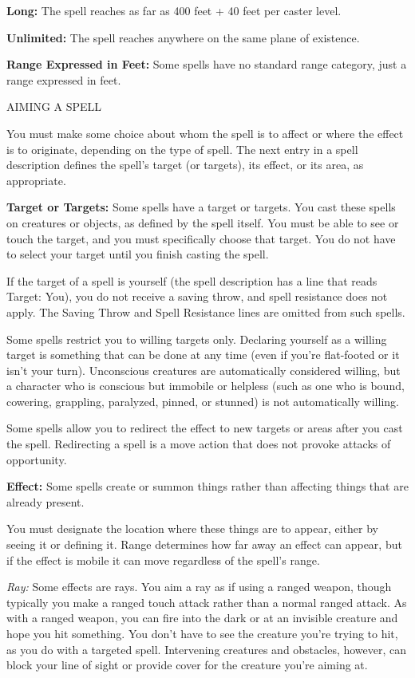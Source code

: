 \documentclass{article}
\begin{document}
\textbf{Long:} The spell reaches as far as 400 feet + 40 feet per caster level.

\textbf{Unlimited:} The spell reaches anywhere on the same plane of existence.

\textbf{Range Expressed in Feet:} Some spells have no standard range category, 
just a range expressed in feet.

\vspace{12pt}
AIMING A SPELL

You must make some choice about whom the spell is to affect or where the effect 
is to originate, depending on the type of spell. The next entry in a spell description 
defines the spell's target (or targets), its effect, or its area, as appropriate.

\textbf{Target or Targets:} Some spells\textit{ }have a target or targets. You 
cast these spells on creatures or objects, as defined by the spell itself. You 
must be able to see or touch the target, and you must specifically choose that 
target. You do not have to select your target until you finish casting the spell.

If the target of a spell is yourself (the spell description has a line that reads 
Target: You), you do not receive a saving throw, and spell resistance does not 
apply. The Saving Throw and Spell Resistance lines are omitted from such spells.

Some spells restrict you to willing targets only. Declaring yourself as a willing 
target is something that can be done at any time (even if you're flat-footed or 
it isn't your turn). Unconscious creatures are automatically considered willing, 
but a character who is conscious but immobile or helpless (such as one who is bound, 
cowering, grappling, paralyzed, pinned, or stunned) is not automatically willing.

Some spells allow you to redirect the effect to new targets or areas after you 
cast the spell. Redirecting a spell is a move action that does not provoke attacks 
of opportunity.

\textbf{Effect:} Some spells create or summon things rather than affecting things 
that are already present.

You must designate the location where these things are to appear, either by seeing 
it or defining it. Range determines how far away an effect can appear, but if the 
effect is mobile it can move regardless of the spell's range.

\textit{Ray: }Some effects are rays. You aim a ray as if using a ranged weapon, 
though typically you make a ranged touch attack rather than a normal ranged attack. 
As with a ranged weapon, you can fire into the dark or at an invisible creature 
and hope you hit something. You don't have to see the creature you're trying to 
hit, as you do with a targeted spell. Intervening creatures and obstacles, however, 
can block your line of sight or provide cover for the creature you're aiming at.
\end{document}
